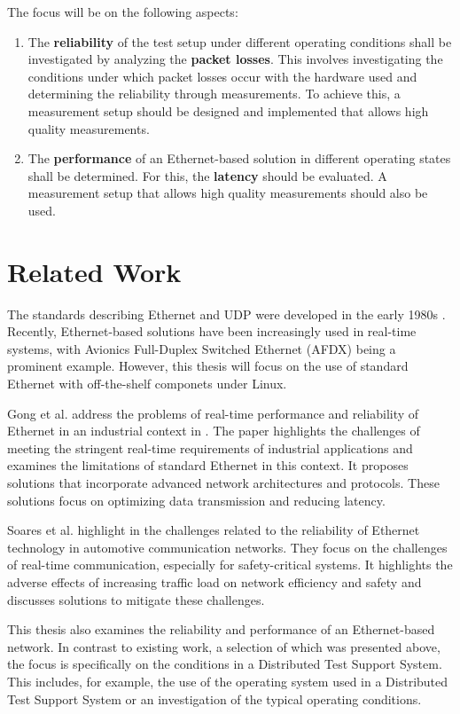  The focus will be on the following aspects:

\begin{enumerate}[label=\arabic*.]
    \item The \textbf{reliability} of the test setup under different operating conditions shall be investigated by analyzing the \textbf{packet losses}. This involves investigating the conditions under which packet losses occur with the hardware used and determining the reliability through measurements. To achieve this, a measurement setup should be designed and implemented that allows high quality measurements.
    \item The \textbf{performance} of an Ethernet-based solution in different operating states shall be determined. For this, the \textbf{latency} should be evaluated. A measurement setup that allows high quality measurements should also be used.
\end{enumerate}


\section{Related Work} \label{chap:introduction:related_work}
The standards describing Ethernet and UDP were developed in the early 1980s \cite{introRelW04}. Recently, Ethernet-based solutions have been increasingly used in real-time systems, with Avionics Full-Duplex Switched Ethernet (AFDX) being a prominent example. However, this thesis will focus on the use of standard Ethernet with off-the-shelf componets under Linux.

Gong et al. address the problems of real-time performance and reliability of Ethernet in an industrial context in \cite{introRelW02}. The paper highlights the challenges of meeting the stringent real-time requirements of industrial applications and examines the limitations of standard Ethernet in this context. It proposes solutions that incorporate advanced network architectures and protocols. These solutions focus on optimizing data transmission and reducing latency.

Soares et al. highlight in \cite{introRelW03} the challenges related to the reliability of Ethernet technology in automotive communication networks. They focus on the challenges of real-time communication, especially for safety-critical systems. It highlights the adverse effects of increasing traffic load on network efficiency and safety and discusses solutions to mitigate these challenges.

This thesis also examines the reliability and performance of an Ethernet-based network. In contrast to existing work, a selection of which was presented above, the focus is specifically on the conditions in a Distributed Test Support System. This includes, for example, the use of the operating system used in a Distributed Test Support System or an investigation of the typical operating conditions.